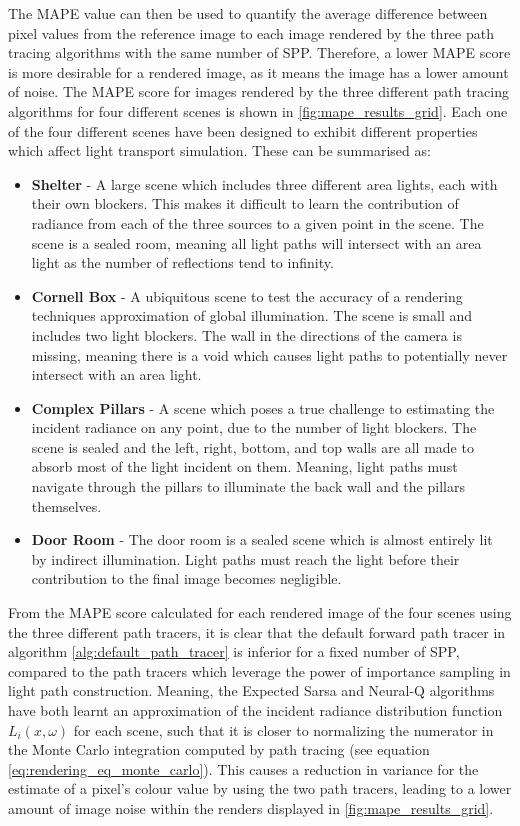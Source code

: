 \documentclass[../dissertation.tex]{subfiles}
\begin{document}
The MAPE value can then be used to quantify the average difference between pixel values from the reference image to each image rendered by the three path tracing algorithms with the same number of SPP. Therefore, a lower MAPE score is more desirable for a rendered image, as it means the image has a lower amount of noise. The MAPE score for images rendered by the three different path tracing algorithms for four different scenes  is shown in \ref{fig:mape_results_grid}. Each one of the four different scenes have been designed to exhibit different properties which affect light transport simulation. These can be summarised as:

\begin{itemize}
\item \textbf{Shelter} - A large scene which includes three different area lights, each with their own blockers. This makes it difficult to learn the contribution of radiance from each of the three sources to a given point in the scene. The scene is a sealed room, meaning all light paths will intersect with an area light as the number of reflections tend to infinity.

\item \textbf{Cornell Box} - A ubiquitous scene to test the accuracy of a rendering techniques approximation of global illumination. The scene is small and includes two light blockers. The wall in the directions of the camera is missing, meaning there is a void which causes light paths to potentially never intersect with an area light.

\item \textbf{Complex Pillars} - A scene which poses a true challenge to estimating the incident radiance on any point, due to the number of light blockers. The scene is sealed and the left, right, bottom, and top walls are all made to absorb most of the light incident on them. Meaning, light paths must navigate through the pillars to illuminate the back wall and the pillars themselves.

\item \textbf{Door Room} - The door room is a sealed scene which is almost entirely lit by indirect illumination. Light paths must reach the light before their contribution to the final image becomes negligible. 
\end{itemize}

From the MAPE score calculated for each rendered image of the four scenes using the three different path tracers, it is clear that the default forward path tracer in algorithm \ref{alg:default_path_tracer} is inferior for a fixed number of SPP, compared to the path tracers which leverage the power of importance sampling in light path construction. Meaning, the Expected Sarsa and Neural-Q algorithms have both learnt an approximation of the incident radiance distribution function $L_i(x, \omega)$ for each scene, such that it is closer to normalizing the numerator in the Monte Carlo integration computed by path tracing (see equation \ref{eq:rendering_eq_monte_carlo}). This causes a reduction in variance for the estimate of a pixel's colour value by using the two path tracers, leading to a lower amount of image noise within the renders displayed in \ref{fig:mape_results_grid}.
\end{document}
